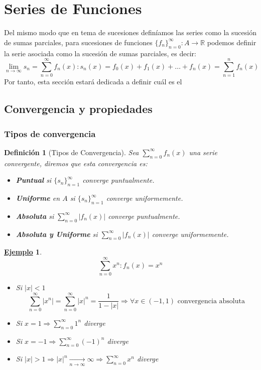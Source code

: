 \documentclass[10pt,a4paper,openright]{book}
\theoremstyle{break}
\newtheorem{defi}{Definición}[chapter]
\newtheorem{ej}{\underline{Ejemplo}}[chapter]
\begin{document}
\section{Series de Funciones}
Del mismo modo que en tema de sucesiones definíamos las series como la sucesión de sumas parciales, para sucesiones de funciones $\{f_n\}_{n = 0}^\infty : A \rightarrow \mathbb{R}$ podemos definir la serie asociada como la sucesión de sumas parciales, es decir:
$$\lim_{n\rightarrow \infty} s_n  = \sum_{n=0}^{\infty} f_n (x) : s_n (x) = f_0 (x) + f_1 (x) + \ldots + f_n (x) = \sum_{n=1}^{n} f_n (x)$$
Por tanto, esta sección estará dedicada a definir cuál es el 

\subsection{Convergencia y propiedades}
\subsubsection{Tipos de convergencia}
\begin{defi}[Tipos de Convergencia]
Sea $\displaystyle \sum_{n=0}^{\infty} f_n (x)$ una serie convergente, diremos que esta convergencia es:
\begin{itemize}
\item \textbf{Puntual} si $\{s_n\}_{n = 1}^\infty$ converge puntualmente.
\item \textbf{Uniforme} en $A$ si $\{s_n\}_{n = 1}^\infty$ converge uniformemente.
\item \textbf{Absoluta} si $\sum_{n=0}^{\infty} |f_n (x)|$ converge puntualmente.
\item \textbf{Absoluta y Uniforme} si $\sum_{n=0}^{\infty} |f_n (x)|$ converge uniformemente.
\end{itemize}
\end{defi}

\begin{ej}
$$\sum_{n=0}^{\infty} x^n : f_n(x) = x^n$$
\begin{itemize}
\item Si $|x| < 1$
$$\sum_{n=0}^{\infty} |x^n| = \sum_{n=0}^{\infty} |x|^n = \frac{1}{1 - |x|} \Rightarrow \forall x \in (-1,1) \mbox{ convergencia absoluta}$$
\item Si $x = 1 \Rightarrow \sum_{n=0}^{\infty} 1^n $ diverge
\item Si $x = -1 \Rightarrow \sum_{n=0}^{\infty} (-1)^n $ diverge
\item Si $|x| > 1 \Rightarrow |x|^n \underset{n \to \infty}{\longrightarrow} \infty \Rightarrow \sum_{n=0}^{\infty} x^n$ diverge
\end{itemize}
\end{ej}
\end{document}
